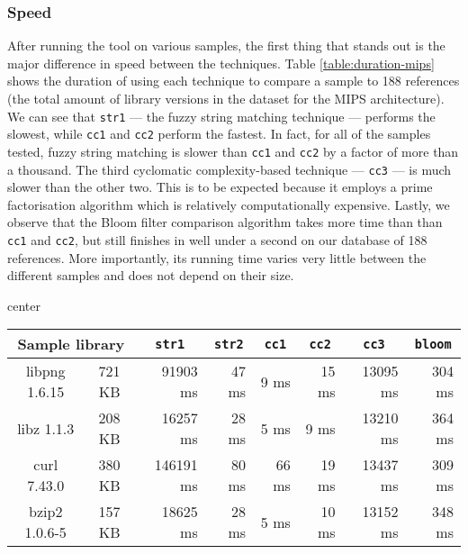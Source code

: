 \documentclass[twocolumn,a4paper]{IEEEtran} %
\begin{document}
\subsubsection{Speed}
\label{sec:results-speed}
After running the tool on various samples, the first thing that stands out is the major difference in speed between the techniques. Table \ref{table:duration-mips} shows the duration of using each technique to compare a sample to 188 references (the total amount of library versions in the dataset for the MIPS architecture). We can see that \texttt{str1} --- the fuzzy string matching technique --- performs the slowest, while \texttt{cc1} and \texttt{cc2} perform the fastest. In fact, for all of the samples tested, fuzzy string matching is slower than \texttt{cc1} and \texttt{cc2} by a factor of more than a thousand. The third cyclomatic complexity-based technique --- \texttt{cc3} --- is much slower than the other two. This is to be expected because it employs a prime factorisation algorithm which is relatively computationally expensive. Lastly, we observe that the Bloom filter comparison algorithm takes more time than than \texttt{cc1} and \texttt{cc2}, but still finishes in well under a second on our database of 188 references. More importantly, its running time varies very little between the different samples and does not depend on their size.


\begin{table*}[h]
\begin{adjustbox}{center}
\centering
\small
\begin{tabular}{@{}cc|rrrrrr@{}}
\toprule
\multicolumn{2}{c|}{Sample library}
              & \multicolumn{1}{c}{\texttt{str1}}
              & \multicolumn{1}{c}{\texttt{str2}}
              & \multicolumn{1}{c}{\texttt{cc1}}
              & \multicolumn{1}{c}{\texttt{cc2}}
              & \multicolumn{1}{c}{\texttt{cc3}}
              & \multicolumn{1}{c}{\texttt{bloom}}  \\ \midrule
libpng 1.6.15 & 721 KB &  91903 ms & 47 ms &  9 ms & 15 ms & 13095 ms & 304 ms  \\
libz 1.1.3    & 208 KB &  16257 ms & 28 ms &  5 ms &  9 ms & 13210 ms & 364 ms  \\
curl 7.43.0   & 380 KB & 146191 ms & 80 ms & 66 ms & 19 ms & 13437 ms & 309 ms  \\
bzip2 1.0.6-5 & 157 KB &  18625 ms & 28 ms &  5 ms & 10 ms & 13152 ms & 348 ms  \\
\bottomrule
\end{tabular}
\end{adjustbox}
\caption{Averaged duration of the comparison of each sample against 188 MIPS library versions on a Core i7 laptop.}
\vspace{.5cm}
\label{table:duration-mips}
\end{table*}
\end{document}
